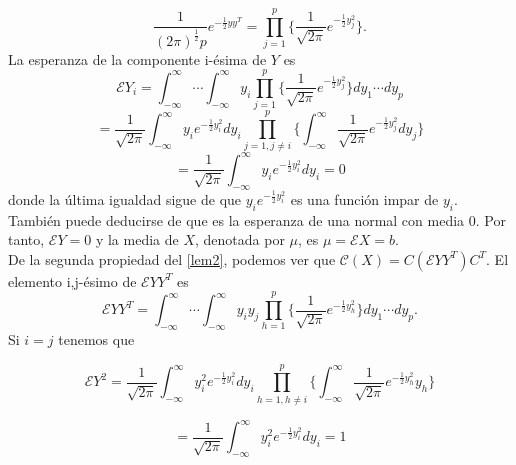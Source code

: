\[ \frac{1}{(2\pi)^\frac{1}{2}p}e^{-\frac{1}{2}yy^T}=\prod_{j=1}^p \lbrace  \frac{1}{\sqrt{2\pi}}e^{-\frac{1}{2}y_j^2} \rbrace. \]
La esperanza de la componente i-ésima de $Y$ es
\[ \mathcal{E}Y_i=\int_{-\infty}^{\infty} \dotsb \int_{-\infty}^{\infty} y_i \prod_{j=1}^p \lbrace  \frac{1}{\sqrt{2\pi}}e^{-\frac{1}{2}y_j^2} \rbrace dy_1 \dotsb dy_p \]
\[ = \frac{1}{\sqrt{2\pi}} \int_{-\infty}^{\infty} y_ie^{-\frac{1}{2}y_i^2}dy_i \prod^p_{j=1,j\neq i} \lbrace \int_{-\infty}^{\infty} \frac{1}{\sqrt{2\pi}}e^{-\frac{1}{2}y_j^2} dy_j \rbrace \]
\[ = \frac{1}{\sqrt{2\pi}} \int_{-\infty}^{\infty} y_ie^{-\frac{1}{2}y_i^2} dy_i=0 \]
donde la última igualdad sigue de que $y_i e^{-\frac{1}{2}y_i^2}$ es una función impar de $y_i$. También puede deducirse de que es la esperanza de una normal con media $0$. Por tanto, $\mathcal{E}Y=0$ y la media de $X$, denotada por $\mu$, es $\mu=\mathcal{E}X=b$.\\
De la segunda propiedad del \autoref{lem2}, podemos ver que $\mathcal{C}(X)=C(\mathcal{E}YY^T)C^T$. El elemento i,j-ésimo de $\mathcal{E}YY^T$ es
\[ \mathcal{E}YY^T= \int_{-\infty}^{\infty} \dotsb \int_{-\infty}^{\infty} y_i y_j \prod_{h=1}^p \lbrace  \frac{1}{\sqrt{2\pi}}e^{-\frac{1}{2}y_h^2} \rbrace dy_1 \dotsb dy_p  .\]
Si $i=j$ tenemos que 

\[ \mathcal{E}Y^2= \frac{1}{\sqrt{2\pi}} \int_{-\infty}^{\infty} y_i^2 e^{-\frac{1}{2}y_i^2} dy_i \prod_{h=1,h\neq i}^p \lbrace  \int_{-\infty}^{\infty} \frac{1}{\sqrt{2\pi}}e^{-\frac{1}{2}y_h^2} y_h \rbrace \]

\[ = \frac{1}{\sqrt{2\pi}} \int_{-\infty}^{\infty} y_i^2 e^{-\frac{1}{2}y_i^2} dy_i = 1 \]

